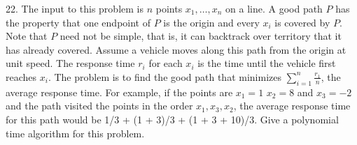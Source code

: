 \documentclass[10pt]{article}
\begin{document}
		22. The input to this problem is $n$ points $x_1, \ldots, x_n$ on a line. A good path $P$ has the property that one
		endpoint of $P$ is the origin and every $x_i$ is covered by $P$. Note that $P$ need not be simple, that is, it
		can backtrack over territory that it has already covered. Assume a vehicle moves along this path from
		the origin at unit speed. The response time $r_i$ for each $x_i$ is the time until the vehicle first reaches
		$x_i$. The problem is to find the good path that minimizes $\sum_{i=1}^{n}\frac{r_1}{n}$, the average response time. For
		example, if the points are $x_1 = 1$ $x_2 = 8$ and $x_3 = -2$ and the path visited the points in the order
		$x_1, x_3, x_2$, the average response time for this path would be 1/3 + (1 + 3)/3 + (1 + 3 + 10)/3. Give a
		polynomial time algorithm for this problem.
\end{document}
